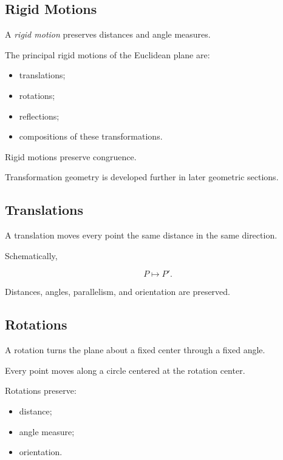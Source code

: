 \subsection{Rigid Motions}
\label{subsec:rigid-motions-euclidean}

A \emph{rigid motion} preserves distances and angle measures.

The principal rigid motions of the Euclidean plane are:

\begin{itemize}
    \item translations;
    \item rotations;
    \item reflections;
    \item compositions of these transformations.
\end{itemize}

Rigid motions preserve congruence.

Transformation geometry is developed further in later geometric sections.

\subsection{Translations}
\label{subsec:euclidean-translations}

A translation moves every point the same distance in the same direction.

Schematically,

\[ P\longmapsto P'. \]

Distances, angles, parallelism, and orientation are preserved.

\subsection{Rotations}
\label{subsec:euclidean-rotations}

A rotation turns the plane about a fixed center through a fixed angle.

Every point moves along a circle centered at the rotation center.

Rotations preserve:

\begin{itemize}
    \item distance;
    \item angle measure;
    \item orientation.
\end{itemize}

